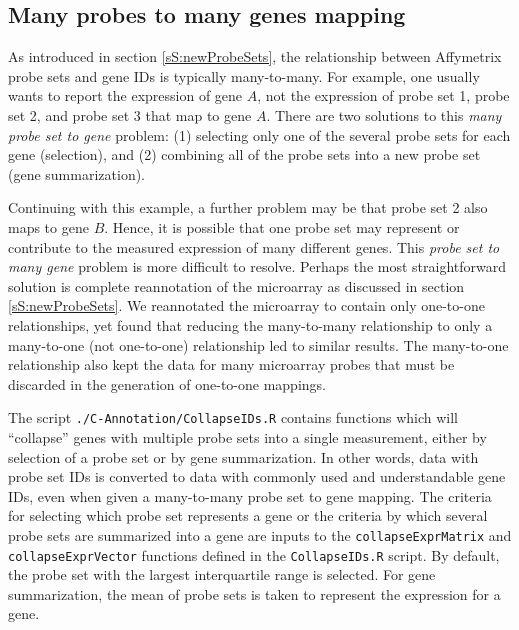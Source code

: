 \subsection{Many probes to many genes mapping}
\label{sS:collapse}

As introduced in section \ref{sS:newProbeSets}, the relationship between 
Affymetrix probe sets and gene IDs is typically many-to-many. 
For example, one usually wants 
to report the expression of gene $A$, not the expression of 
probe set 1, probe set 2, and probe set 3 that map to gene $A$. There are two
solutions to this \emph{many probe set to gene} problem: (1) selecting only one of the several 
probe sets for each gene (selection), and (2) combining all of the probe sets 
into a new probe set (gene summarization).

Continuing with this example, a further problem may be 
that probe set 2 also maps to gene $B$.
Hence, it is possible that one probe set may represent or 
contribute to the measured expression of many different genes. This
\emph{probe set to many gene} problem is more difficult to resolve.
Perhaps the most straightforward solution is complete reannotation of
the microarray as discussed in section \ref{sS:newProbeSets}. We
reannotated the microarray to contain only one-to-one relationships, yet found that 
reducing the many-to-many relationship to only a many-to-one (not one-to-one) relationship 
led to similar results. The many-to-one relationship also kept the data
for many microarray probes that must be discarded
in the generation of one-to-one mappings.

The script \texttt{./C-Annotation/CollapseIDs.R} contains functions which
will ``collapse'' genes with multiple probe sets into a single
measurement, either by selection of a probe set or by gene summarization. In other
words, data with probe set IDs is converted to data with commonly used and
understandable gene IDs, even when given a many-to-many probe set to gene 
mapping. The criteria for selecting which probe set represents a gene or 
the criteria by which several probe sets are summarized into a gene are 
inputs to the \texttt{collapseExprMatrix} and \texttt{collapseExprVector}
functions defined in the \texttt{CollapseIDs.R} script. By default, the probe set
with the largest interquartile range is selected. For gene summarization,
the mean of probe sets is taken to represent the expression for a gene.

